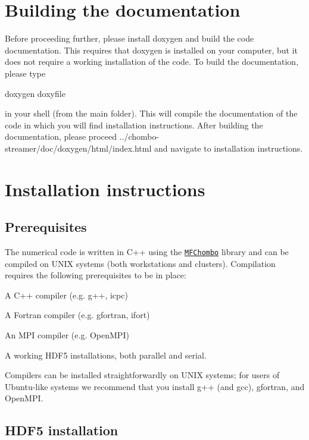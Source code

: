 \section*{Building the documentation }

Before proceeding further, please install doxygen and build the code documentation. This requires that doxygen is installed on your computer, but it does not require a working installation of the code. To build the documentation, please type \begin{DoxyVerb}doxygen doxyfile 
\end{DoxyVerb}


in your shell (from the main folder). This will compile the documentation of the code in which you will find installation instructions. After building the documentation, please proceed ../chombo-\/streamer/doc/doxygen/html/index.html and navigate to installation instructions.

\section*{Installation instructions }

\subsection*{Prerequisites }

The numerical code is written in C++ using the \href{https://commons.lbl.gov/display/chombo/Chombo+-+Software+for+Adaptive+Solutions+of+Partial+Differential+Equations}{\tt M\+F\+Chombo} library and can be compiled on U\+N\+IX systems (both workstations and clusters). Compilation requires the following prerequisites to be in place\+:


\begin{DoxyEnumerate}
\item A C++ compiler (e.\+g. g++, icpc)
\item A Fortran compiler (e.\+g. gfortran, ifort)
\item An M\+PI compiler (e.\+g. Open\+M\+PI)
\item A working H\+D\+F5 installations, both parallel and serial.
\end{DoxyEnumerate}

Compilers can be installed straightforwardly on U\+N\+IX systems; for users of Ubuntu-\/like systems we recommend that you install g++ (and gcc), gfortran, and Open\+M\+PI.

\subsection*{H\+D\+F5 installation }

